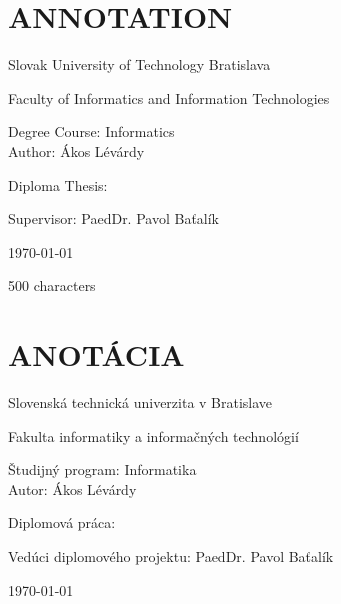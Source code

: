 \documentclass[\myFontSize,oneside,english,hidelinks,a4paper]{article}
\begin{document}
\titleformat{\section}{\LARGE\bfseries}{\thesection}{1em}{}
\titleformat{\subsection}{\Large\bfseries}{\thesubsection}{1em}{}
\titleformat{\subsubsection}{\Large\bfseries}{\thesubsubsection}{1em}{}

%
%

\newpage{}
\thispagestyle{empty}
\mbox{}

\newpage{} 
\thispagestyle{empty}
\section*{ANNOTATION}
\begin{minipage}[t]{1\columnwidth}%
Slovak University of Technology Bratislava 

Faculty of Informatics and Information Technologies

Degree Course: Informatics\\

Author: Ákos Lévárdy

Diploma Thesis: \thesisTitle

Supervisor: PaedDr. Pavol Baťalík

\today%
\end{minipage}
\bigskip{}

500 characters


\newpage{}
\thispagestyle{empty}
\mbox{}

\newpage{}
\thispagestyle{empty}
\section*{ANOTÁCIA}
\begin{minipage}[t]{1\columnwidth}%
Slovenská technická univerzita v Bratislave

Fakulta informatiky a informačných technológií

Študijný program: Informatika\\

Autor: Ákos Lévárdy

Diplomová práca: \thesisTitle

Vedúci diplomového projektu: PaedDr. Pavol Baťalík

\today%
\end{minipage}
\bigskip{}
\end{document}
